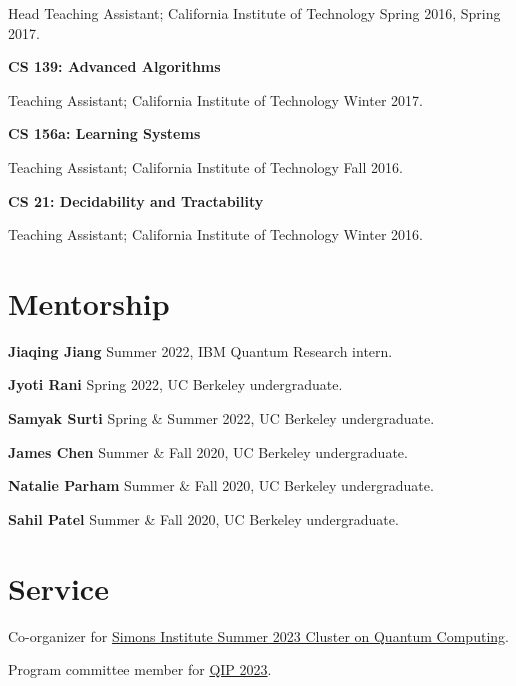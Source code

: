 \documentclass[11pt]{article}
\begin{document}
Head Teaching Assistant; California Institute of Technology Spring 2016, Spring 2017.

\textbf{CS 139: Advanced Algorithms}

Teaching Assistant; California Institute of Technology Winter 2017.

\textbf{CS 156a: Learning Systems}

Teaching Assistant; California Institute of Technology Fall 2016.

\textbf{CS 21: Decidability and Tractability}

Teaching Assistant; California Institute of Technology Winter 2016.




\section{Mentorship}

\textbf{Jiaqing Jiang}
Summer 2022,
IBM Quantum Research intern.


\textbf{Jyoti Rani}
Spring 2022, 
UC Berkeley undergraduate.

\textbf{Samyak Surti}
Spring \& Summer 2022,
UC Berkeley undergraduate.

\textbf{James Chen}
Summer \& Fall 2020,
UC Berkeley undergraduate.

\textbf{Natalie Parham}
Summer \& Fall 2020,
UC Berkeley undergraduate.

\textbf{Sahil Patel} 
Summer \& Fall 2020,
UC Berkeley undergraduate.

\section{Service}
Co-organizer for \href{https://simons.berkeley.edu/programs/summer-cluster-quantum-computing}{Simons Institute Summer 2023 Cluster on Quantum Computing}.

Program committee member for \href{https://indico.cern.ch/event/1175020/}{QIP 2023}.
\end{document}
